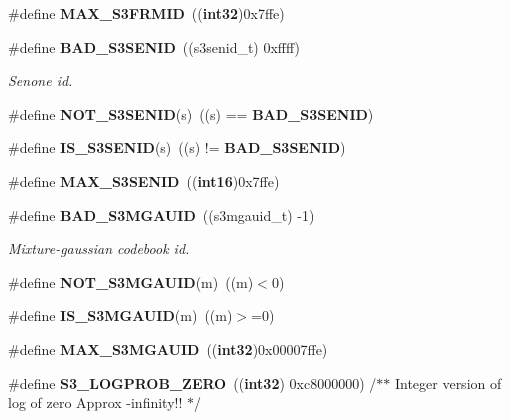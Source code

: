 \begin{DoxyCompactItemize}
\item 
\#define {\bfseries \-M\-A\-X\-\_\-\-S3\-F\-R\-M\-I\-D}~(({\bf int32})0x7ffe)\label{s3types_8h_a10aa0ceb75567a7318108b337e8b253a}

\item 
\#define {\bf \-B\-A\-D\-\_\-\-S3\-S\-E\-N\-I\-D}~((s3senid\-\_\-t) 0xffff)\label{s3types_8h_a072c42ea82002d9435305133750c4e2e}

\begin{DoxyCompactList}\small\item\em \-Senone id. \end{DoxyCompactList}\item 
\#define {\bfseries \-N\-O\-T\-\_\-\-S3\-S\-E\-N\-I\-D}(s)~((s) == {\bf \-B\-A\-D\-\_\-\-S3\-S\-E\-N\-I\-D})\label{s3types_8h_a48cd9804ec6b0647f147d6e979f3de74}

\item 
\#define {\bfseries \-I\-S\-\_\-\-S3\-S\-E\-N\-I\-D}(s)~((s) != {\bf \-B\-A\-D\-\_\-\-S3\-S\-E\-N\-I\-D})\label{s3types_8h_aad006f5edbf6b42a4dfcc398d1403316}

\item 
\#define {\bfseries \-M\-A\-X\-\_\-\-S3\-S\-E\-N\-I\-D}~(({\bf int16})0x7ffe)\label{s3types_8h_ab704f3bdb72f51ccac7f7388644d37f1}

\item 
\#define {\bf \-B\-A\-D\-\_\-\-S3\-M\-G\-A\-U\-I\-D}~((s3mgauid\-\_\-t) -\/1)\label{s3types_8h_a08bccaa82b9d1990a9a98368a1091ff6}

\begin{DoxyCompactList}\small\item\em \-Mixture-\/gaussian codebook id. \end{DoxyCompactList}\item 
\#define {\bfseries \-N\-O\-T\-\_\-\-S3\-M\-G\-A\-U\-I\-D}(m)~((m)$<$0)\label{s3types_8h_ab1d53f52278ec85cfe171bee12695618}

\item 
\#define {\bfseries \-I\-S\-\_\-\-S3\-M\-G\-A\-U\-I\-D}(m)~((m)$>$=0)\label{s3types_8h_ad1e1aaef79517a20741015c485690e31}

\item 
\#define {\bfseries \-M\-A\-X\-\_\-\-S3\-M\-G\-A\-U\-I\-D}~(({\bf int32})0x00007ffe)\label{s3types_8h_a85f630c5da85e5490f9b4a873f9dc187}

\item 
\#define {\bfseries \-S3\-\_\-\-L\-O\-G\-P\-R\-O\-B\-\_\-\-Z\-E\-R\-O}~(({\bf int32}) 0xc8000000)	/$\ast$$\ast$ Integer version of log of zero Approx -\/infinity!! $\ast$/\label{s3types_8h_a227b2026462b1665a6508388099afcfe}


\end{DoxyCompactItemize}
